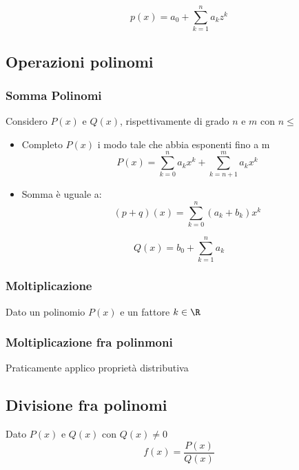 \[
	p\left( x \right) = a_0 + \sum_{k=1}^{n} a_k z^k
\]
\subsection{Operazioni polinomi}
\label{sec:operazionipolinomi}
\subsubsection{Somma Polinomi}
Considero $P\left( x \right) $ e $Q\left( x \right) $, rispettivamente di grado $n$ e $m$ con $n \le $
\begin{itemize}
	\item Completo $P\left( x \right) $ i modo tale che abbia esponenti fino a m
	      \[
		      P\left( x \right) = \sum_{k=0}^{n} a_k x^{k} + \sum_{k=n+1}^{m} a_k x^{k}
	      \]
	\item Somma è uguale a:
	      \[
		      \left( p+q \right) \left( x \right) = \sum_{k=0}^{n} \left( a_k + b_k \right)  x^k
	      \]
\end{itemize}
\[
	Q\left( x \right) = b_0 + \sum_{k=1}^{n} a_k
\]

\subsubsection{Moltiplicazione}
\label{sub:moltiplicazione}
Dato un polinomio $P\left( x \right)$ e un fattore $k \in  \R$

\subsubsection{Moltiplicazione fra polinmoni}
\label{sub:moltiplicazionefrapolinmoni}
Praticamente applico proprietà distributiva

\subsection{Divisione fra polinomi}
\label{sub:divisionefrapolinomi}
Dato $P\left( x \right) $ e $ Q\left( x \right) $ con $Q\left( x \right) \neq 0$
\[
	f\left( x \right) = \frac{P\left( x \right) }{Q\left( x \right) }
\]

